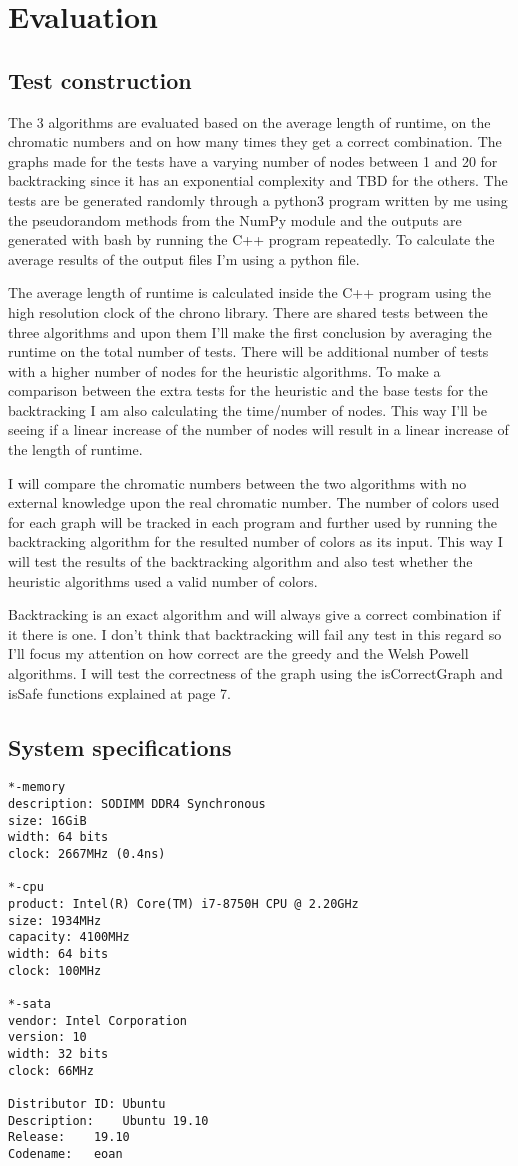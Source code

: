 \documentclass[runningheads]{llncs}
\begin{document}
\section{Evaluation}
\subsection{Test construction}
The 3 algorithms are evaluated based on the average length of runtime, on the chromatic numbers and on
how many times they get a correct combination. The graphs made for the tests have a varying number of nodes
between 1 and 20 for backtracking since it has an exponential complexity and TBD for the others.
The tests are be generated randomly through a python3 program written by me using the pseudorandom methods from the NumPy
module and the outputs are generated with bash by running the C++ program repeatedly. To calculate the average results of 
the output files I'm using a python file.

The average length of runtime is calculated inside the C++ program using the high resolution clock of the chrono library. 
There are shared tests between the three algorithms
and upon them I'll make the first conclusion by averaging the runtime on the total number of tests. 
There will be additional number of tests with a higher number
of nodes for the heuristic algorithms. To make a comparison between the extra tests for the heuristic and the
base tests for the backtracking I am also calculating the time/number of nodes. This way I'll be seeing if a linear
increase of the number of nodes will result in a linear increase of the length of runtime.

I will compare the chromatic numbers between the two algorithms with no external knowledge upon the real chromatic
number. The number of colors used for each graph will be tracked in each program and further used by running
the backtracking algorithm for the resulted number of colors as its input. This way I will test
the results of the backtracking algorithm and also test whether the heuristic algorithms used a valid number of
colors.

Backtracking is an exact algorithm and will always give a correct combination if it there is one. I don't think that
backtracking will fail any test in this regard so I'll focus my attention on how correct are the greedy and the Welsh Powell algorithms.
I will test the correctness of the graph using the isCorrectGraph and isSafe functions explained at page 7.

\subsection{System specifications}
\begin{verbatim}
*-memory
description: SODIMM DDR4 Synchronous
size: 16GiB
width: 64 bits
clock: 2667MHz (0.4ns)

*-cpu
product: Intel(R) Core(TM) i7-8750H CPU @ 2.20GHz
size: 1934MHz
capacity: 4100MHz
width: 64 bits
clock: 100MHz

*-sata
vendor: Intel Corporation
version: 10
width: 32 bits
clock: 66MHz

Distributor ID:	Ubuntu
Description:	Ubuntu 19.10
Release:	19.10
Codename:	eoan
\end{verbatim}
\end{document}

